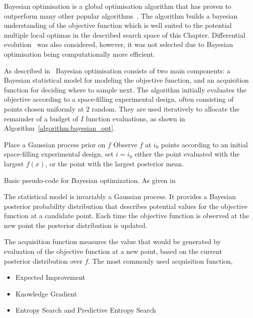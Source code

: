 Bayesian optimisation is a global optimisation
algorithm that has proven to outperform many other popular
algorithms~\cite{Jones2001}. The algorithm builds a bayesian understanding of
the objective function which is well suited to the potential multiple local optimas in
the described search space of this Chapter. Differential evolution~\cite{Storn1997}
was also considered, however, it was not selected due to Bayesian optimisation being
computationally more efficient.

As described in~\cite{Frazier2018} Bayesian optimisation consists of two main
components: a Bayesian statistical model for modeling the objective function,
and an acquisition function for deciding where to sample next. The algorithm
initially evaluates the objective according to a space-filling experimental
design, often consisting of points chosen uniformly at 2 random. They are used
iteratively to allocate the remainder of a budget of \(I\) function evaluations, as
shown in Algorithm~\ref{algorithm:bayesian_opt}.

\begin{algorithm}[H]
Place a Gaussian process prior on \(f\)\;
Observe \(f\) at \(i_0\) points according to an initial space-filling experimental design, set \(i = i_0\) \;
\Return either the point evaluated with the largest \(f(x)\), or the point with the largest posterior mean.
\caption{Basic pseudo-code for Bayesian optimization. As given in~\cite{Frazier2018}}\label{algorithm:bayesian_opt}
\end{algorithm}

The statistical model is invariably a Gaussian process. It provides a Bayesian
posterior probability distribution that describes potential values for the
objective function at a candidate point. Each time the objective function is
observed at the new point the posterior distribution is updated.

The acquisition function measures the value that would be generated by
evaluation of the objective function at a new point, based on the current
posterior distribution over \(f\). The most commonly used acquisition function,

\begin{itemize}
    \item Expected Improvement~\cite{Jones1998}
    \item Knowledge Gradient~\cite{Frazier2009}
    \item Entropy Search and Predictive Entropy Search~\cite{Hennig2012}
\end{itemize}

